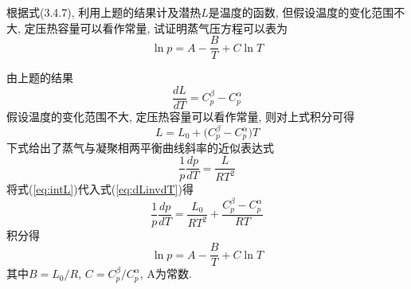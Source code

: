\begin{problem}[3.11]
根据式(3.4.7), 利用上题的结果计及潜热$L$是温度的函数, 但假设温度的变化范围不大, 定压热容量可以看作常量, 试证明蒸气压方程可以表为
\[
\ln p = A -\frac{B}{T} + C\ln T
\]
\end{problem}
\begin{solution}
由上题的结果
\[
\frac{dL}{dT} = C_p^\beta -C_p^\alpha
\]
假设温度的变化范围不大, 定压热容量可以看作常量, 则对上式积分可得
\begin{equation}\label{eq:intL}
L = L_0 + \big(C_p^\beta -C_p^\alpha\big)T
\end{equation}
下式给出了蒸气与凝聚相两平衡曲线斜率的近似表达式
\begin{equation}\tag{3.4.7}\label{eq:dLinvdT}
\frac{1}{p}\frac{dp}{dT} = \frac{L}{RT^2}
\end{equation}
将式(\ref{eq:intL})代入式(\ref{eq:dLinvdT})得
\[
\frac{1}{p}\frac{dp}{dT} = \frac{L_0}{RT^2} + \frac{C_p^\beta -C_p^\alpha}{RT}
\]
积分得
\[
\ln p = A - \frac{B}{T} + C\ln T
\]
其中$B=L_0/R$, $C=C_p^\beta/C_p^\alpha$, A为常数.
\end{solution}
